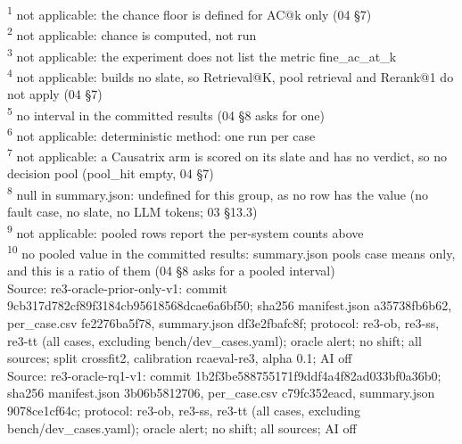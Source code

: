 \begin{table}[t]
\begin{tabular}{lllllllllllllllllllll}
\hline
\end{tabular}
\par\smallskip\footnotesize
\textsuperscript{1} not applicable: the chance floor is defined for AC@k only (04 \S{}7)\\
\textsuperscript{2} not applicable: chance is computed, not run\\
\textsuperscript{3} not applicable: the experiment does not list the metric fine\_ac\_at\_k\\
\textsuperscript{4} not applicable: builds no slate, so Retrieval@K, pool retrieval and Rerank@1 do not apply (04 \S{}7)\\
\textsuperscript{5} no interval in the committed results (04 \S{}8 asks for one)\\
\textsuperscript{6} not applicable: deterministic method: one run per case\\
\textsuperscript{7} not applicable: a Causatrix arm is scored on its slate and has no verdict, so no decision pool (pool\_hit empty, 04 \S{}7)\\
\textsuperscript{8} null in summary.json: undefined for this group, as no row has the value (no fault case, no slate, no LLM tokens; 03 \S{}13.3)\\
\textsuperscript{9} not applicable: pooled rows report the per-system counts above\\
\textsuperscript{10} no pooled value in the committed results: summary.json pools case means only, and this is a ratio of them (04 \S{}8 asks for a pooled interval)\\
Source: re3-oracle-prior-only-v1: commit 9cb317d782cf89f3184cb95618568dcae6a6bf50; sha256 manifest.json a35738fb6b62, per\_case.csv fe2276ba5f78, summary.json df3e2fbafc8f; protocol: re3-ob, re3-ss, re3-tt (all cases, excluding bench/dev\_cases.yaml); oracle alert; no shift; all sources; split crossfit2, calibration rcaeval-re3, alpha 0.1; AI off\\
Source: re3-oracle-rq1-v1: commit 1b2f3be588755171f9ddf4a4f82ad033bf0a36b0; sha256 manifest.json 3b06b5812706, per\_case.csv c79fc352eacd, summary.json 9078ce1cf64c; protocol: re3-ob, re3-ss, re3-tt (all cases, excluding bench/dev\_cases.yaml); oracle alert; no shift; all sources; AI off\\
\end{table}

